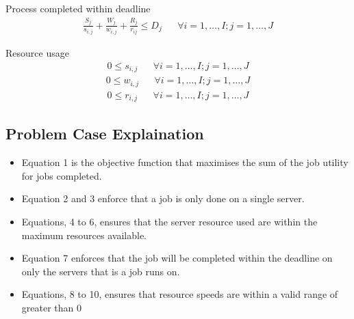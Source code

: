 \documentclass[fleqn]{article}
\begin{document}
Process completed within deadline
\begin{align}
    \frac{S_j}{s_{i,j}} + \frac{W_j}{w_{i,j}} + \frac{R_j}{r_{ij}} \leq D_j && \forall i = 1,\dots,I; j = 1,\dots,J
\end{align}

Resource usage
\begin{align}
    0 \le s_{i,j} && \forall i = 1,\dots,I; j = 1,\dots,J
\end{align}
\begin{align}
    0 \le w_{i,j} && \forall i = 1,\dots,I; j = 1,\dots,J
\end{align}
\begin{align}
    0 \le r_{i,j} && \forall i = 1,\dots,I; j = 1,\dots,J
\end{align}

\subsection{Problem Case Explaination}\label{subsec:problem-case-explaination}
\begin{itemize}
    \item Equation 1 is the objective function that maximises the sum of the job utility for jobs completed.
    \item Equation 2 and 3 enforce that a job is only done on a single server.
    \item Equations, 4 to 6, ensures that the server resource used are within the maximum resources available.
    \item Equation 7 enforces that the job will be completed within the deadline on only the servers that is a job runs on.
    \item Equations, 8 to 10, ensures that resource speeds are within a valid range of greater than 0
\end{itemize}
\end{document}
